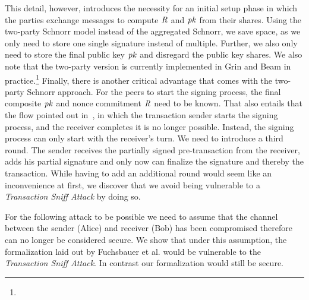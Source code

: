 This detail, however, introduces the necessity for an initial setup phase in which the parties exchange messages to compute $\mathit{R}$ and $\mathit{pk}$ from their shares.
Using the two-party Schnorr model instead of the aggregated Schnorr, we save space, as we only need to store one single signature instead of multiple.
Further, we also only need to store the final public key $\mathit{pk}$ and disregard the public key shares.
We also note that the two-party version is currently implemented in Grin and Beam in practice.\footnote{\urlgrinexplained}
Finally, there is another critical advantage that comes with the two-party Schnorr approach.
For the peers to start the signing process, the final composite $\mathit{pk}$ and nonce commitment $\mathit{R}$ need to be known.
That also entails that the flow pointed out in~\cite{fuchsbauer2019aggregate}, in which the transaction sender starts the signing process, and the receiver completes it is no longer possible.
Instead, the signing process can only start with the receiver's turn.
We need to introduce a third round.
The sender receives the partially signed pre-transaction from the receiver, adds his partial signature and only now can finalize the signature and thereby the transaction.
While having to add an additional round would seem like an inconvenience at first, we discover that we avoid being vulnerable to a \emph{Transaction Sniff Attack} by doing so.

For the following attack to be possible we need to assume that the channel between the sender (Alice) and receiver (Bob) has been compromised therefore can no longer be considered secure.
We show that under this assumption, the formalization laid out by Fuchsbauer et al. would be vulnerable to the \emph{Transaction Sniff Attack}.
In contrast our formalization would still be secure.
